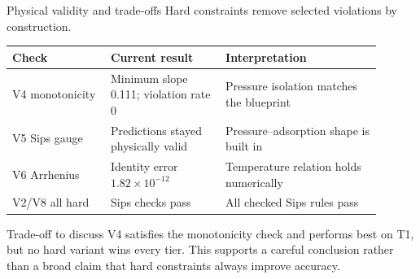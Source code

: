 \documentclass[aspectratio=169,10pt]{beamer}
\newcommand{\smallgray}[1]{\textcolor{projectGray}{#1}}
\begin{document}
\begin{frame}{Physical validity and trade-offs}
  \smallgray{Hard constraints remove selected violations by construction.}

  \vspace{0.25cm}
  \begin{table}
    \centering
    \scriptsize
    \begin{tabular}{p{0.24\linewidth}p{0.28\linewidth}p{0.38\linewidth}}
      \toprule
      \textbf{Check}  & \textbf{Current result}                      & \textbf{Interpretation}                             \\
      \midrule
      V4 monotonicity & Minimum slope 0.111; violation rate 0        & Pressure isolation matches the blueprint            \\
      V5 Sips gauge   & Predictions stayed physically valid          & Pressure--adsorption shape is built in              \\
      V6 Arrhenius    & Identity error \(1.82\times 10^{-12}\)       & Temperature relation holds numerically              \\
      V2/V8 all hard  & Sips checks pass                             & All checked Sips rules pass                         \\
      \bottomrule
    \end{tabular}
  \end{table}

  \vspace{0.25cm}
  \begin{block}{Trade-off to discuss}
    V4 satisfies the monotonicity check and performs best on T1, but no hard
    variant wins every tier. This supports a careful conclusion rather than a
    broad claim that hard constraints always improve accuracy.
  \end{block}
\end{frame}
\end{document}
